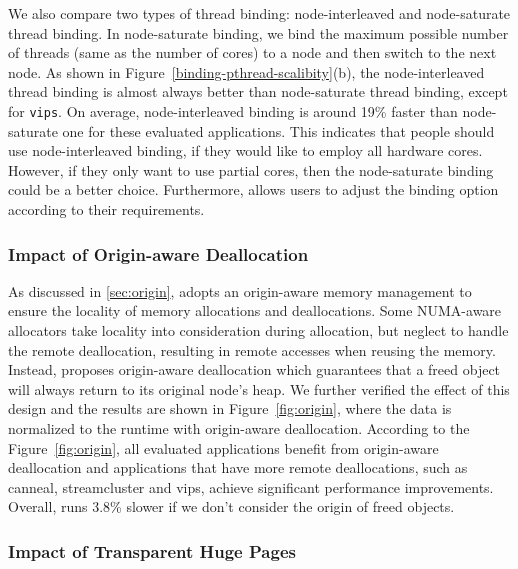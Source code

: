 
We also compare two types of thread binding: node-interleaved and node-saturate thread binding. In node-saturate binding, we bind the maximum possible number of threads (same as the number of cores) to a node and then switch to the next node. As shown in Figure~\ref{binding-pthread-scalibity}(b), the node-interleaved thread binding is almost always better than node-saturate thread binding, except for \texttt{vips}. On average, node-interleaved binding is around 19\% faster than node-saturate one for these evaluated applications. This indicates that people should use node-interleaved binding, if they would like to employ all hardware cores. However, if they only want to use partial cores, then the node-saturate binding could be a better choice. Furthermore, \NM{} allows users to adjust the binding option according to their requirements.


\subsubsection{Impact of Origin-aware Deallocation}

As discussed in \ref{sec:origin}, \NM{} adopts an origin-aware memory management to ensure the locality of memory allocations and deallocations. Some NUMA-aware allocators take locality into consideration during allocation, but neglect to handle the remote deallocation, resulting in remote accesses when reusing the memory. Instead, \NM{} proposes origin-aware deallocation which guarantees that a freed object will always return to its original node's heap. We further verified the effect of this design and the results are shown in Figure~\ref{fig:origin}, where the data is normalized to the runtime with origin-aware deallocation. According to the Figure~\ref{fig:origin}, all evaluated applications benefit from origin-aware deallocation and applications that have more remote deallocations, such as canneal, streamcluster and vips, achieve significant performance improvements. Overall, \NM{} runs 3.8\% slower if we don't consider the origin of freed objects.


\subsubsection{Impact of Transparent Huge Pages}


